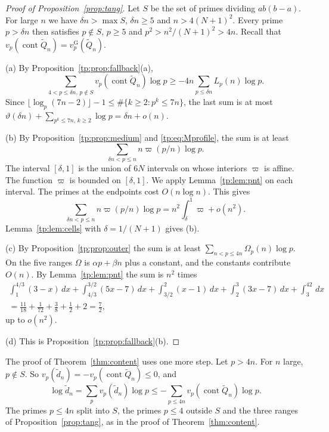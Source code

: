 \documentclass[11pt]{amsart}
\theoremstyle{definition}
\theoremstyle{remark}
\numberwithin{equation}{section}
\newcommand{\vG}{v_p^{\mathrm G}}
\newcommand{\cont}{\operatorname{cont}}
\begin{document}
\begin{proof}[Proof of Proposition~\ref{prop:tang}]
Let $S$ be the set of primes dividing $ab(b-a)$. For large $n$ we have $\delta n>\max S$, $\delta n\ge5$ and
$n>4(N+1)^2$. Every prime $p>\delta n$ then satisfies $p\notin S$, $p\ge5$ and $p^2>n^2/(N+1)^2>4n$. Recall that
$v_p(\cont\tilde Q_n)=\vG(\tilde Q_n)$.

(a) By Proposition~\ref{tp:prop:fallback}(a),
\[
 \sum_{4<p\le\delta n,\,p\notin S}v_p(\cont\tilde Q_n)\log p\ge-4n\sum_{p\le\delta n}L_p(n)\log p .
\]
Since $\lfloor\log_p(7n-2)\rfloor-1\le\#\{k\ge2:p^k\le7n\}$, the last sum is at most
$\vartheta(\delta n)+\sum_{p^k\le7n,\,k\ge2}\log p=\delta n+o(n)$.

(b) By Proposition~\ref{tp:prop:medium} and \eqref{tp:eq:Mprofile}, the sum is at least
\[
 \sum_{\delta n<p\le n}n\varpi(p/n)\log p .
\]
The interval $[\delta,1]$ is the union of $6N$ intervals on whose
interiors $\varpi$ is affine. The function $\varpi$ is bounded on $[\delta,1]$.
We apply Lemma~\ref{tp:lem:pnt} on each interval. The primes at the endpoints cost $O(n\log n)$. This gives
\[
 \sum_{\delta n<p\le n}n\varpi(p/n)\log p=n^2\int_\delta^1\varpi+o(n^2).
\] Lemma~\ref{tp:lem:cells} with $\delta=1/(N+1)$
gives (b).

(c) By Proposition~\ref{tp:prop:outer} the sum is at least $\sum_{n<p\le4n}\Omega_p(n)\log p$. On the five ranges
$\Omega$ is $\alpha p+\beta n$ plus a constant, and the constants contribute $O(n)$. By Lemma~\ref{tp:lem:pnt}
the sum is $n^2$ times
\begin{multline*}
 \int_1^{4/3}(3-x)\,dx+\int_{4/3}^{3/2}(5x-7)\,dx+\int_{3/2}^2(x-1)\,dx+\int_2^3(3x-7)\,dx+\int_3^42\,dx\\
 =\frac{11}{18}+\frac1{72}+\frac38+\frac12+2=\frac72,
\end{multline*}
up to $o(n^2)$.

(d) This is Proposition~\ref{tp:prop:fallback}(b).
\end{proof}

The proof of Theorem~\ref{thm:content} uses one more step. Let $p>4n$. For $n$ large, $p\notin S$. So
$v_p(\tilde d_n)=-v_p(\cont\tilde Q_n)\le0$, and
\[
 \log\tilde d_n=\sum_pv_p(\tilde d_n)\log p\le-\sum_{p\le4n}v_p(\cont\tilde Q_n)\log p .
\]
The primes $p\le4n$ split into $S$, the primes $p\le4$ outside $S$ and the three ranges of
Proposition~\ref{prop:tang}, as in the proof of Theorem~\ref{thm:content}.

\end{document}

